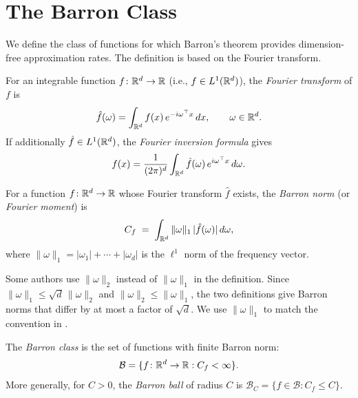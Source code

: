 \documentclass[11pt,a4paper]{article}
\begin{document}
\section{The Barron Class}
\label{sec:barron-class}

We define the class of functions for which Barron's theorem provides
dimension-free approximation rates.  The definition is based on the
Fourier transform.

\begin{definition}
\label{def:fourier}
For an integrable function $f \colon \mathbb{R}^d \to \mathbb{R}$ (i.e.,
$f \in L^1(\mathbb{R}^d)$), the \emph{Fourier transform} of $f$ is
\[
  \hat{f}(\omega) = \int_{\mathbb{R}^d} f(x) \, e^{-i \omega^\top x} \, dx,
  \qquad \omega \in \mathbb{R}^d.
\]
If additionally $\hat{f} \in L^1(\mathbb{R}^d)$, the \emph{Fourier inversion
formula} gives
\[
  f(x) = \frac{1}{(2\pi)^d} \int_{\mathbb{R}^d} \hat{f}(\omega) \,
  e^{i \omega^\top x} \, d\omega.
\]
\end{definition}

\begin{definition}
\label{def:barron-norm}
For a function $f \colon \mathbb{R}^d \to \mathbb{R}$ whose Fourier transform $\hat{f}$
exists, the \emph{Barron norm} (or \emph{Fourier moment}) is
\[
  C_f \;=\; \int_{\mathbb{R}^d} \|\omega\|_1 \, |\hat{f}(\omega)| \, d\omega,
\]
where $\|\omega\|_1 = |\omega_1| + \cdots + |\omega_d|$ is the $\ell^1$
norm of the frequency vector.
\end{definition}

\begin{remark}
\label{rem:barron-norm-variants}
Some authors use $\|\omega\|_2$ instead of $\|\omega\|_1$ in the
definition.  Since $\|\omega\|_1 \le \sqrt{d} \, \|\omega\|_2$ and
$\|\omega\|_2 \le \|\omega\|_1$, the two definitions give Barron norms
that differ by at most a factor of $\sqrt{d}$.  We use $\|\omega\|_1$ to
match the convention in \citet{barron1993}.
\end{remark}

\begin{definition}
\label{def:barron-class}
The \emph{Barron class} is the set of functions with finite Barron norm:
\[
  \mathcal{B} = \{ f \colon \mathbb{R}^d \to \mathbb{R} : C_f < \infty \}.
\]
More generally, for $C > 0$, the \emph{Barron ball} of radius $C$ is
$\mathcal{B}_C = \{ f \in \mathcal{B} : C_f \le C \}$.
\end{definition}
\end{document}
